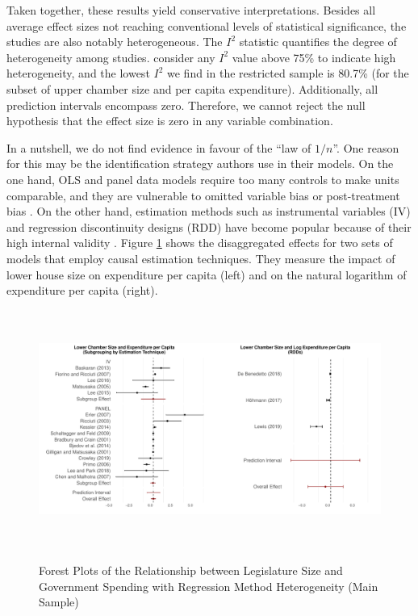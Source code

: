 \documentclass[11pt,a4paper,]{article}
\begin{document}
Taken together, these results yield conservative interpretations.
Besides all average effect sizes not reaching conventional levels of
statistical significance, the studies are also notably heterogeneous.
The \(I^2\) statistic quantifies the degree of heterogeneity among
studies. \citet{higgins2019cochrane} consider any \(I^2\) value above
75\% to indicate high heterogeneity, and the lowest \(I^2\) we find in
the restricted sample is 80.7\% (for the subset of upper chamber size
and per capita expenditure). Additionally, all prediction intervals
encompass zero. Therefore, we cannot reject the null hypothesis that the
effect size is zero in any variable combination.

In a nutshell, we do not find evidence in favour of the ``law of
\(1/n\)''. One reason for this may be the identification strategy
authors use in their models. On the one hand, OLS and panel data models
require too many controls to make units comparable, and they are
vulnerable to omitted variable bias or post-treatment bias
\citep{cinelli2020making, pearl2015conditioning}. On the other hand,
estimation methods such as instrumental variables (IV) and regression
discontinuity designs (RDD) have become popular because of their high
internal validity \citep{angrist2008mostly}. Figure \ref{fig:plots2}
shows the disaggregated effects for two sets of models that employ
causal estimation techniques. They measure the impact of lower house
size on expenditure per capita (left) and on the natural logarithm of
expenditure per capita (right).

\vspace{.5cm}

\begin{figure}[htb]
\begin{center}
\caption{Forest Plots of the Relationship between Legislature Size and Government Spending with Regression Method Heterogeneity (Main Sample)}
\vspace{.3cm}
\includegraphics[width=1\linewidth, height=7.8cm]{../graphs/graph2.pdf}
\label{fig:plots2}
\end{center}
\end{figure}
\end{document}
